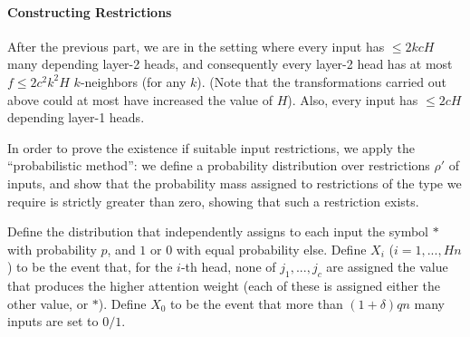 \documentclass[11pt,a4paper]{article}
\begin{document}



\paragraph{Constructing Restrictions}
After the previous part, we are in the setting where every input has $\leq 2kcH$ many depending layer-2 heads, and consequently every layer-2 head has at most $f \leq 2c^2k^2H$ $k$-neighbors (for any $k$).
(Note that the transformations carried out above could at most have increased the value of $H$).
Also, every input has $\leq 2cH$ depending layer-1 heads.


In order to prove the existence if suitable input restrictions, we apply the ``probabilistic method'': we define a probability distribution over restrictions $\rho'$ of inputs, and show that the probability mass assigned to restrictions of the type we require is strictly greater than zero, showing that such a restriction exists.

Define the distribution that independently assigns to each input the symbol $*$ with probability $p$, and $1$ or $0$ with equal probability else.
Define $X_i$ ($i=1, ..., H n$) to be the event that, for the $i$-th head, none of $j_1, ..., j_c$ are assigned the value that produces the higher attention weight (each of these is assigned either the other value, or $*$).
Define $X_0$ to be the event that more than $(1+\delta)qn$ many inputs are set to $0/1$.
\end{document}
